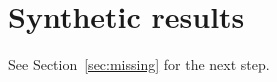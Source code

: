 \section{Synthetic results}
\label{sec:synthetic-results}

See Section~\ref{sec:missing} for the next step.
